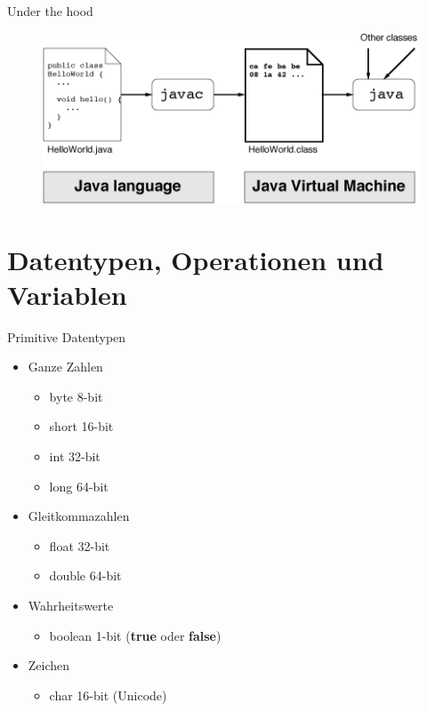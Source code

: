 \documentclass[18pt]{beamer}
\begin{document}
\begin{frame}{Under the hood}
    \begin{figure}
        \includegraphics[scale=0.8]{img/jvm.png}
    \end{figure}
\end{frame}

\section{Datentypen, Operationen und Variablen}

\begin{frame}{Primitive Datentypen}
    \begin{itemize}
        \item Ganze Zahlen
        \begin{itemize}
            \item byte {\tiny 8-bit}
            \item short {\tiny 16-bit}
            \item int {\tiny 32-bit}
            \item long {\tiny 64-bit}
        \end{itemize}
        \item Gleitkommazahlen
        \begin{itemize}
            \item float {\tiny 32-bit}
            \item double {\tiny 64-bit}
        \end{itemize}
        \item Wahrheitswerte
        \begin{itemize}
            \item boolean {\tiny 1-bit (\textbf{true} oder \textbf{false})}
        \end{itemize}
        \item Zeichen
        \begin{itemize}
            \item char {\tiny 16-bit (Unicode)}
        \end{itemize}
    \end{itemize}
\end{frame}
\end{document}
